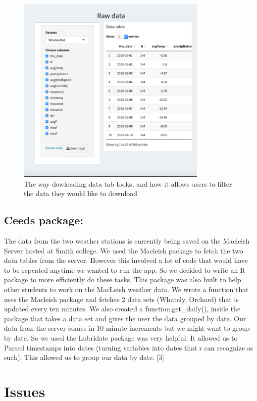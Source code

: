 \documentclass[10pt,letterpaper]{article}
\begin{document}
\begin{figure}
\includegraphics[width=350px]{rawdatatab} \caption{The way dowloading data tab looks, and how it allows users to filter the data they would like to download}\label{fig:unnamed-chunk-8}
\end{figure}

\subsection{Ceeds package:}\label{ceeds-package}

The data from the two weather stations is currently being saved on the
Macleish Server hosted at Smith college. We used the Macleish package to
fetch the two data tables from the server. However this involved a lot
of code that would have to be repeated anytime we wanted to run the app.
So we decided to write an R package to more efficiently do these tasks.
This package was also built to help other students to work on the
MacLeish weather data. We wrote a function that uses the Macleish
package and fetches 2 data sets (Whately, Orchard) that is updated every
ten minutes. We also created a function,get\_daily(), inside the package
that takes a data set and gives the user the data grouped by date. Our
data from the server comes in 10 minute increments but we might want to
group by date. So we used the Lubridate package was very helpful. It
allowed us to Parsed timestamps into dates (turning variables into dates
that r can recognize as such). This allowed us to group our data by
date. {[}3{]}

\section{Issues}\label{issues}
\end{document}
